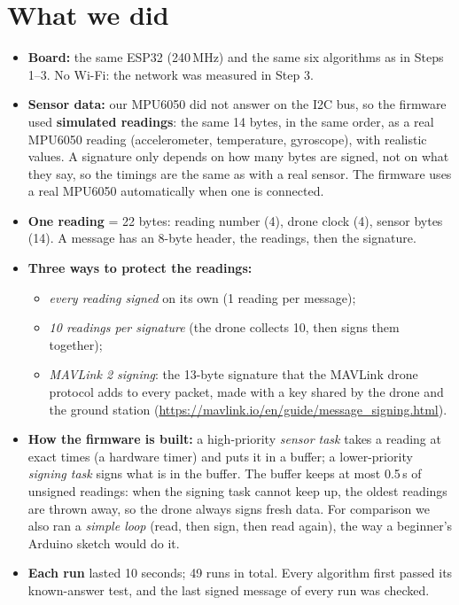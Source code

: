 \documentclass[10pt,a4paper]{article}
\begin{document}
\section{What we did}

\begin{itemize}[nosep]
  \item \textbf{Board:} the same ESP32 (240\,MHz) and the same six algorithms as in Steps 1--3. No
        Wi-Fi: the network was measured in Step 3.
  \item \textbf{Sensor data:} our MPU6050 did not answer on the I2C bus, so the firmware used
        \textbf{simulated readings}: the same 14 bytes, in the same order, as a real MPU6050 reading
        (accelerometer, temperature, gyroscope), with realistic values. A signature only depends on how
        many bytes are signed, not on what they say, so the timings are the same as with a real sensor.
        The firmware uses a real MPU6050 automatically when one is connected.
  \item \textbf{One reading} = 22 bytes: reading number (4), drone clock (4), sensor bytes (14). A
        message has an 8-byte header, the readings, then the signature.
  \item \textbf{Three ways to protect the readings:}
        \begin{itemize}[nosep]
          \item \emph{every reading signed} on its own (1 reading per message);
          \item \emph{10 readings per signature} (the drone collects 10, then signs them together);
          \item \emph{MAVLink 2 signing}: the 13-byte signature that the MAVLink drone protocol adds to
                every packet, made with a key shared by the drone and the ground station
                (\url{https://mavlink.io/en/guide/message_signing.html}).
        \end{itemize}
  \item \textbf{How the firmware is built:} a high-priority \emph{sensor task} takes a reading at
        exact times (a hardware timer) and puts it in a buffer; a lower-priority \emph{signing task}
        signs what is in the buffer. The buffer keeps at most 0.5\,s of unsigned readings: when the
        signing task cannot keep up, the oldest readings are thrown away, so the drone always signs
        fresh data. For comparison we also ran a \emph{simple loop} (read, then sign, then read again),
        the way a beginner's Arduino sketch would do it.
  \item \textbf{Each run} lasted 10 seconds; 49 runs in total. Every algorithm first passed its
        known-answer test, and the last signed message of every run was checked.
\end{itemize}
\end{document}

